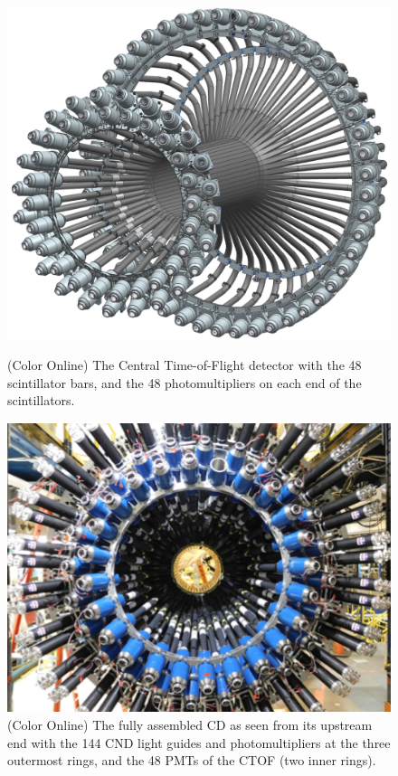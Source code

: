 \documentclass[final,3p,twocolumn]{elsarticle}
\begin{document}
\begin{figure}[t!]
\includegraphics[width=1.0\columnwidth]{ctof-design.png}
\caption{(Color Online) The Central Time-of-Flight detector with the 48 scintillator bars, and the 48 photomultipliers on each end
of the scintillators.} 
\vspace{0.5cm}\centerline{\includegraphics[angle=90,width=0.9\columnwidth]{cnd-ctof.png}}
\caption{(Color Online) The fully assembled CD as seen from its upstream end with the 144 CND light guides and
photomultipliers at the three outermost rings, and the 48 PMTs of the CTOF (two inner rings). } 
\label{ctof-cnd}
\end{figure} 
\end{document}
